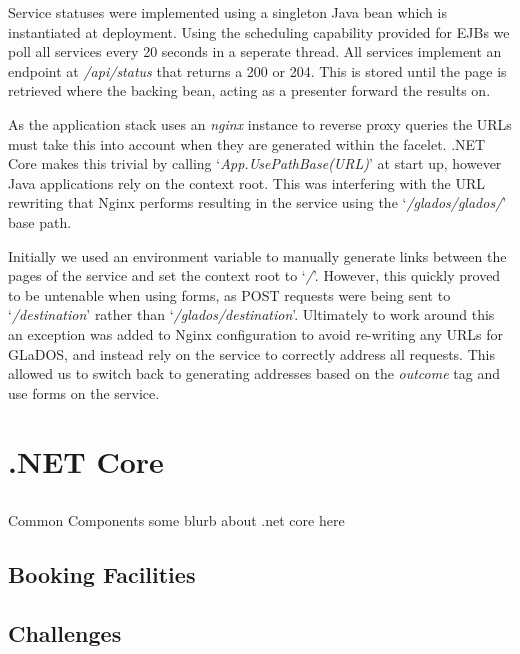         \par
        Service statuses were implemented using a singleton Java bean which is instantiated at deployment. Using the scheduling capability provided for EJBs we poll all services every 20 seconds in a seperate thread. All services implement an endpoint at \textit{/api/status} that returns a 200 or 204. This is stored until the page is retrieved where the backing bean, acting as a presenter forward the results on.

        \par
        As the application stack uses an \textit{nginx} instance to reverse proxy queries the URLs must take this into account when they are generated within the facelet. .NET Core makes this trivial by calling `\textit{App.UsePathBase(URL)}' at start up, however Java applications rely on the context root. This was interfering with the URL rewriting that Nginx performs resulting in the service using the 
        `\textit{/glados/glados/}' base path.

        \par
        Initially we used an environment variable to manually generate links between the pages of the service and set the context root to 
        `\textit{/}'. However, this quickly proved to be untenable when using forms, as POST requests were being sent to 
        `\textit{/destination}' 
        rather than 
        `\textit{/glados/destination}'. Ultimately to work around this an exception was added to Nginx configuration to avoid re-writing any URLs for GLaDOS, and instead rely on the service to correctly address all requests. This allowed us to switch back to generating addresses based on the \textit{outcome} tag and use forms on the service.



\section{.NET Core}
    \subsection{}{Common Components}
some blurb about .net core here

    \subsection{Booking Facilities}

    \subsection{Challenges}

